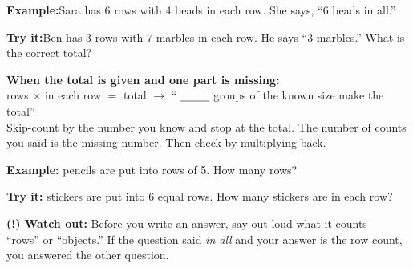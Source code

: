 \documentclass[12pt]{article}
\begin{document}
\begin{examplebox}
\textbf{Example:}\quad Sara has 6 rows with 4 beads in each row. She says, ``6 beads in all.''
\end{examplebox}

\begin{tryitbox}
\textbf{Try it:}\quad Ben has 3 rows with 7 marbles in each row. He says ``3 marbles.'' What is the correct total?\\[2pt]
\end{tryitbox}


\begin{formulabox}
\textbf{When the total is given and one part is missing:}\\[3pt]
rows $\times$ in each row $=$ total \quad $\rightarrow$ \quad ``$\;\underline{\hspace{0.9cm}}$ groups of the known size make the total''\\[3pt]
Skip-count by the number you know and stop at the total. The number of counts you said is the missing number. Then check by multiplying back.
\end{formulabox}

\begin{examplebox}
\textbf{Example:} pencils are put into rows of 5. How many rows?
\end{examplebox}

\begin{tryitbox}
\textbf{Try it:} stickers are put into 6 equal rows. How many stickers are in each row?\\[2pt]
\end{tryitbox}

\begin{watchoutbox}
\textbf{(!) Watch out:} Before you write an answer, say out loud what it counts ---
``rows'' or ``objects.'' If the question said \emph{in all} and your answer is the
row count, you answered the other question.
\end{watchoutbox}
\end{document}
